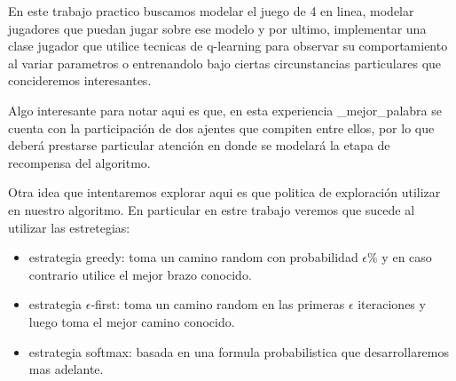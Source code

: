 En este trabajo practico buscamos modelar el juego de 4 en linea, modelar jugadores que puedan jugar sobre ese modelo y por ultimo, implementar una clase jugador que utilice tecnicas de q-learning para observar su comportamiento al variar parametros o entrenandolo bajo ciertas circunstancias particulares que concideremos interesantes.

Algo interesante para notar aqui es que, en esta experiencia \buscar_mejor_palabra se cuenta con la participación de dos ajentes que compiten entre ellos, por lo que deberá prestarse particular atención en donde se modelará la etapa de recompensa del algoritmo. \completar

Otra idea que intentaremos explorar aqui es que politica de exploración utilizar en nuestro algoritmo. En particular en estre trabajo veremos que sucede al utilizar las estretegias:
\begin{itemize}
\item estrategia greedy: toma un camino random con probabilidad $\epsilon\%$ y en caso contrario utilice el mejor brazo conocido.
\item estrategia $\epsilon$-first: toma un camino random en las primeras $\epsilon$ iteraciones y luego toma el mejor camino conocido.
\item estrategia softmax: basada en una formula probabilistica que desarrollaremos mas adelante.
\end{itemize}


